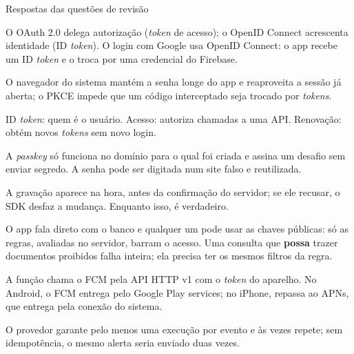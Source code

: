 \documentclass[aspectratio=169,10pt]{beamer}
\begin{document}
\begin{frame}{Respostas das questões de revisão}
  \begin{respostas}
    \item O OAuth 2.0 delega autorização (\emph{token} de acesso); o OpenID Connect acrescenta identidade (ID \emph{token}). O login com Google usa OpenID Connect: o app recebe um ID \emph{token} e o troca por uma credencial do Firebase.
    \item O navegador do sistema mantém a senha longe do app e reaproveita a sessão já aberta; o PKCE impede que um código interceptado seja trocado por \emph{tokens}.
    \item ID \emph{token}: quem é o usuário. Acesso: autoriza chamadas a uma API. Renovação: obtém novos \emph{tokens} sem novo login.
    \item A \emph{passkey} só funciona no domínio para o qual foi criada e assina um desafio sem enviar segredo. A senha pode ser digitada num site falso e reutilizada.
    \item A gravação aparece na hora, antes da confirmação do servidor; se ele recusar, o SDK desfaz a mudança. Enquanto isso,  é verdadeiro.
    \item O app fala direto com o banco e qualquer um pode usar as chaves públicas: só as regras, avaliadas no servidor, barram o acesso. Uma consulta que \textbf{possa} trazer documentos proibidos falha inteira; ela precisa ter os mesmos filtros da regra.
    \item A função chama o FCM pela API HTTP v1 com o \emph{token} do aparelho. No Android, o FCM entrega pelo Google Play services; no iPhone, repassa ao APNs, que entrega pela conexão do sistema.
    \item O provedor garante pelo menos uma execução por evento e às vezes repete; sem idempotência, o mesmo alerta seria enviado duas vezes.
  \end{respostas}
\end{frame}

\end{document}
